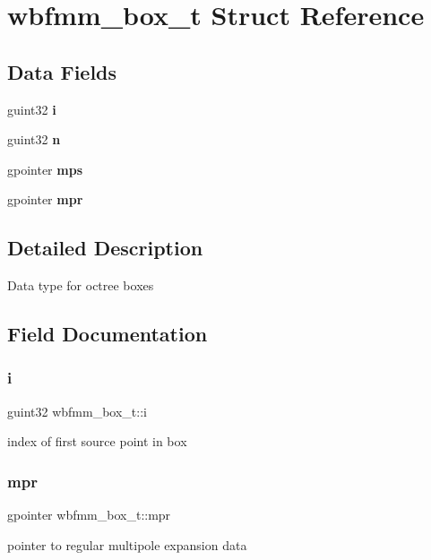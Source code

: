 \section{wbfmm\+\_\+box\+\_\+t Struct Reference}
\label{structwbfmm__box__t}
\subsection*{Data Fields}
\begin{DoxyCompactItemize}
\item 
guint32 \textbf{ i}
\item 
guint32 \textbf{ n}
\item 
gpointer \textbf{ mps}
\item 
gpointer \textbf{ mpr}
\end{DoxyCompactItemize}


\subsection{Detailed Description}
Data type for octree boxes 

\subsection{Field Documentation}
\mbox{\label{structwbfmm__box__t_a5f24b619335d6e99896542180f60925a}} 
\subsubsection{i}
{\footnotesize\ttfamily guint32 wbfmm\+\_\+box\+\_\+t\+::i}

index of first source point in box \mbox{\label{structwbfmm__box__t_a3dad2b2788aad8a07c85ef1d09bb70be}} 
\subsubsection{mpr}
{\footnotesize\ttfamily gpointer wbfmm\+\_\+box\+\_\+t\+::mpr}

pointer to regular multipole expansion data \mbox{\label{structwbfmm__box__t_a4f82965274a1740568a2ddfef3190db9}} 
